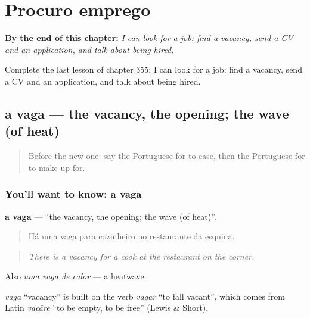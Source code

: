
\chapter{Procuro emprego}
\label{ch:pt-procuro-emprego}

\begin{chapteropening}
\textbf{By the end of this chapter:} \emph{I can look for a job: find a vacancy, send a CV and an application, and talk about being hired.}

Complete the last lesson of chapter 355: I can look for a job: find a vacancy, send a CV and an application, and talk about being hired.
\end{chapteropening}

\section[a vaga]{a vaga — the vacancy, the opening; the wave (of heat)}

\label{lesson:PT-C355-vaga}



\begin{quote}
Before the new one: say the Portuguese for to ease, then the Portuguese for to make up for.
\end{quote}

\subsection*{You'll want to know: a vaga}
\textbf{a vaga} — \textquotedblleft{}the vacancy, the opening; the wave (of heat)\textquotedblright{}.

\begin{quote}
Há uma vaga para cozinheiro no restaurante da esquina.
\end{quote}

\begin{quote}
\emph{There is a vacancy for a cook at the restaurant on the corner.}
\end{quote}

Also \emph{uma vaga de calor} — a heatwave.

\begin{cousinweb}
\emph{vaga} \textquotedblleft{}vacancy\textquotedblright{} is built on the verb \emph{vagar} \textquotedblleft{}to fall vacant\textquotedblright{}, which comes from Latin \emph{vacāre} \textquotedblleft{}to be empty, to be free\textquotedblright{} (Lewis \& Short).
\end{cousinweb}

